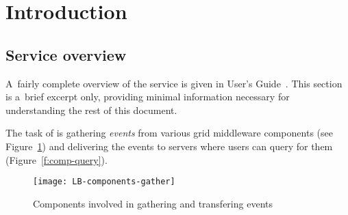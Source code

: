 %
%
%
%
\section{Introduction}

\subsection{Service overview}

A~fairly complete overview of the \LB service is given in \LB User's Guide~\cite{lbug}.
This section is a~brief excerpt only, providing minimal information necessary for
understanding the rest of this document.

The task of \LB is gathering \emph{\LB events} from various grid middleware components
(see Figure~\ref{f:comp-gather})
and delivering the events to \LB servers where users can query for them
(Figure~\ref{f:comp-query}).

\begin{figure}[ht]
\centering
\texttt{[image: LB-components-gather]}
\caption{Components involved in gathering and transfering \LB events}
\label{f:comp-gather}
\end{figure}

